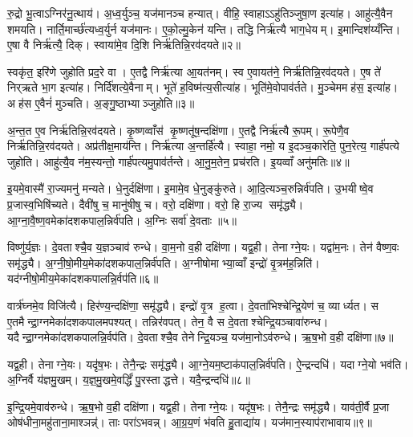 रु॒द्रो भू॒त्वाऽग्निर॑नू॒त्थाय॑। अ॒ध्व॒र्युञ्च॒ यज॑मानञ्च हन्यात्। वीहि॒ स्वाहाऽऽहु॑तिञ्जुषा॒ण इत्या॑ह। आहु॑त्यै॒वैन शमयति। नार्ति॒मार्च्छ॑त्यध्व॒र्युर्न यज॑मानः। ए॒को॒ल्मु॒केन॑ यन्ति। तद्धि निर्\mbox{}ऋ॑त्यै भाग॒धेयम्। इ॒मान्दिश॑य्यँन्ति। ए॒षा वै निर्\mbox{}ऋ॑त्यै॒ दिक्। स्वाया॑मे॒व दि॒शि निर्\mbox{}ऋ॑तिन्नि॒रव॑दयते॥२॥

स्वकृ॑त॒ इरि॑णे जुहोति प्रद॒रे वा। ए॒तद्वै निर्\mbox{}ऋ॑त्या आ॒यत॑नम्। स्व ए॒वायत॑ने॒ निर्\mbox{}ऋ॑तिन्नि॒रव॑दयते। ए॒ष ते॑ निर्‌ऋते भा॒ग इत्या॑ह। निर्दि॑शत्ये॒वैनाम्। भूते॑ ह॒विष्म॑त्य॒सीत्या॑ह। भूति॑मे॒वोपाव॑र्तते। मु॒ञ्चेममह॑स॒ इत्या॑ह। अह॑स ए॒वैनं॑ मुञ्चति। अ॒ङ्गु॒ष्ठाभ्याञ्जुहोति॥३॥

अ॒न्त॒त ए॒व निर्\mbox{}ऋ॑तिन्नि॒रव॑दयते। कृ॒ष्णव्वाँस॑ कृ॒ष्णतू॑ष॒न्दक्षि॑णा। ए॒तद्वै निर्\mbox{}ऋ॑त्यै रू॒पम्। रू॒पेणै॒व निर्\mbox{}ऋ॑तिन्नि॒रव॑दयते। अप्र॑तीक्ष॒माय॑न्ति। निर्\mbox{}ऋ॑त्या अ॒न्तर्\mbox{}हि॑त्यै। स्वाहा॒ नमो॒ य इ॒दञ्च॒कारेति॒ पुन॒रेत्य॒ गार्\mbox{}ह॑पत्ये जुहोति। आहु॑त्यै॒व न॑म॒स्यन्तो॒ गार्\mbox{}ह॑पत्यमु॒पाव॑र्तन्ते। आ॒नु॒म॒तेन॒ प्रच॑रति। इ॒यव्वाँ अनु॑मतिः॥४॥

इ॒यमे॒वास्मै॑ रा॒ज्यमनु॑ मन्यते। धे॒नुर्दक्षि॑णा। इ॒मामे॒व धे॒नुङ्कु॑रुते। आ॒दि॒त्यञ्च॒रुन्निर्व॑पति। उ॒भयीष्वे॒व प्र॒जास्व॒भिषि॑च्यते। दैवी॑षु च॒ मानु॑षीषु च। वरो॒ दक्षि॑णा। वरो॒ हि रा॒ज्य समृ॑द्ध्यै। आ॒ग्ना॒वै॒ष्ण॒वमेका॑दशकपाल॒न्निर्व॑पति। अ॒ग्निः सर्वा॑ दे॒वताः॥५॥

विष्णु॑र्य॒ज्ञः। दे॒वताश्चै॒व य॒ज्ञञ्चाव॑ रुन्धे। वा॒म॒नो व॒ही दक्षि॑णा। यद्व॒ही। तेनाग्ने॒यः। यद्वा॑म॒नः। तेन॑ वैष्ण॒वः समृ॑द्ध्यै। अ॒ग्नी॒षो॒मीय॒मेका॑दशकपाल॒न्निर्व॑पति। अ॒ग्नीषोमाभ्या॒व्वाँ इन्द्रो॑ वृ॒त्रम॑ह॒न्निति॑। यद॑ग्नीषो॒मीय॒मेका॑दशकपालन्नि॒र्वप॑ति॥६॥

वार्त्र॑घ्नमे॒व विजि॑त्यै। हिर॑ण्य॒न्दक्षि॑णा॒ समृ॑द्ध्यै। इन्द्रो॑ वृ॒त्र ह॒त्वा। दे॒वता॑भिश्चेन्द्रि॒येण॑ च॒ व्यार्ध्यत। स ए॒तमैन्द्रा॒ग्नमेका॑दशकपालमपश्यत्। तन्निर॑वपत्। तेन॒ वै स दे॒वताश्चेन्द्रि॒यञ्चावा॑रुन्ध। यदैन्द्रा॒ग्नमेका॑दशकपालन्नि॒र्वप॑ति। दे॒वताश्चै॒व तेनेन्द्रि॒यञ्च॒ यज॑मा॒नोऽव॑रुन्धे। ऋ॒ष॒भो व॒ही दक्षि॑णा॥७॥

यद्व॒ही। तेनाग्ने॒यः। यदृ॑ष॒भः। तेनै॒न्द्रः समृ॑द्ध्यै। आ॒ग्ने॒यम॒ष्टाक॑पाल॒न्निर्व॑पति। ऐ॒न्द्रन्दधि॑। यदाग्ने॒यो भव॑ति। अ॒ग्निर्वै य॑ज्ञमु॒खम्। य॒ज्ञ॒मु॒खमे॒वर्द्धिं॑ पु॒रस्ताद्धत्ते। यदै॒न्द्रन्दधि॑॥८॥

इ॒न्द्रि॒यमे॒वाव॑रुन्धे। ऋ॒ष॒भो व॒ही दक्षि॑णा। यद्व॒ही। तेनाग्ने॒यः। यदृ॑ष॒भः। तेनै॒न्द्रः समृ॑द्ध्यै। याव॑ती॒र्वै प्र॒जा ओष॑धीना॒महु॑ताना॒माश्ञन्न्॑। ताः परा॑ऽभवन्न्। आ॒ग्र॒य॒णं भ॑वति हु॒ताद्या॑य। यज॑मान॒स्याप॑राभावाय॥९॥

